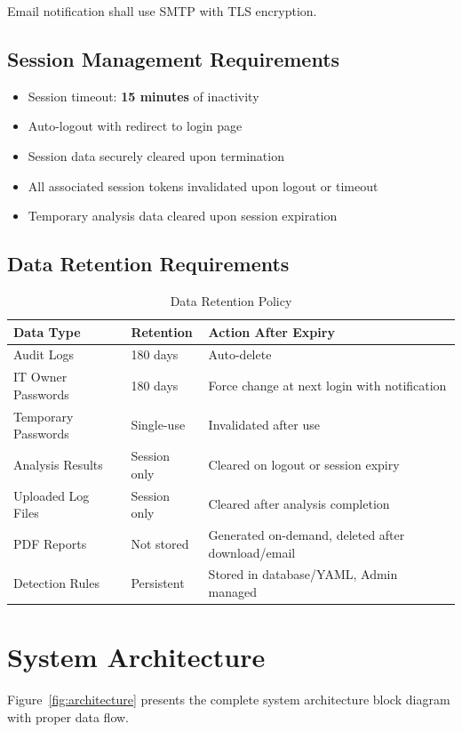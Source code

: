 \documentclass[12pt,a4paper]{article}
\begin{document}
Email notification shall use SMTP with TLS encryption.

\subsection{Session Management Requirements}

\begin{itemize}
    \item Session timeout: \textbf{15 minutes} of inactivity
    \item Auto-logout with redirect to login page
    \item Session data securely cleared upon termination
    \item All associated session tokens invalidated upon logout or timeout
    \item Temporary analysis data cleared upon session expiration
\end{itemize}

\subsection{Data Retention Requirements}

\begin{table}[H]
\centering
\begin{tabular}{|p{4.5cm}|p{3cm}|p{7cm}|}
\hline
\textbf{Data Type} & \textbf{Retention} & \textbf{Action After Expiry} \\
\hline
Audit Logs & 180 days & Auto-delete \\
\hline
IT Owner Passwords & 180 days & Force change at next login with notification \\
\hline
Temporary Passwords & Single-use & Invalidated after use \\
\hline
Analysis Results & Session only & Cleared on logout or session expiry \\
\hline
Uploaded Log Files & Session only & Cleared after analysis completion \\
\hline
PDF Reports & Not stored & Generated on-demand, deleted after download/email \\
\hline
Detection Rules & Persistent & Stored in database/YAML, Admin managed \\
\hline
\end{tabular}
\caption{Data Retention Policy}
\label{tab:retention-policy}
\end{table}
\newpage
\section{System Architecture}
Figure~\ref{fig:architecture} presents the complete system architecture block diagram with proper data flow.
\end{document}
